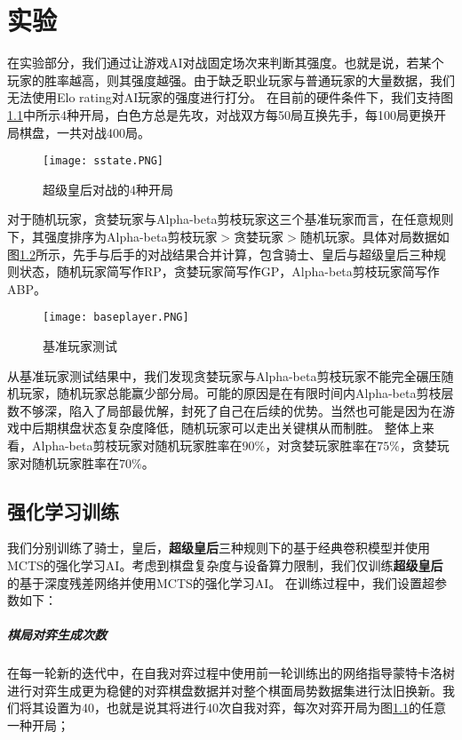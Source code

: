 \chapter{实验}
\label{chap:experiment}
在实验部分，我们通过让游戏AI对战固定场次来判断其强度。也就是说，若某个玩家的胜率越高，则其强度越强。由于缺乏职业玩家与普通玩家的大量数据，我们无法使用Elo rating对AI玩家的强度进行打分\cite{glickman1999rating}。
在目前的硬件条件下，我们支持图\ref{fig:sstate}中所示4种开局，白色方总是先攻，对战双方每50局互换先手，每100局更换开局棋盘，一共对战400局。
\begin{figure}[H]
    \centering
    \texttt{[image: sstate.PNG]}
    \caption[sstate]{%
        超级皇后对战的4种开局%
      }
    \label{fig:sstate}
\end{figure}
对于随机玩家，贪婪玩家与Alpha-beta剪枝玩家这三个基准玩家而言，在任意规则下，其强度排序为Alpha-beta剪枝玩家$>$贪婪玩家$>$随机玩家。具体对局数据如图\ref{fig:baseresult}所示，先手与后手的对战结果合并计算，包含骑士、皇后与超级皇后三种规则状态，随机玩家简写作RP，贪婪玩家简写作GP，Alpha-beta剪枝玩家简写作ABP。
\begin{figure}[htb]
    \centering
    \texttt{[image: baseplayer.PNG]}
    \caption[baseresult]{%
        基准玩家测试%
      }
    \label{fig:baseresult}
\end{figure}
从基准玩家测试结果中，我们发现贪婪玩家与Alpha-beta剪枝玩家不能完全碾压随机玩家，随机玩家总能赢少部分局。可能的原因是在有限时间内Alpha-beta剪枝层数不够深，陷入了局部最优解，封死了自己在后续的优势。当然也可能是因为在游戏中后期棋盘状态复杂度降低，随机玩家可以走出关键棋从而制胜。
整体上来看，Alpha-beta剪枝玩家对随机玩家胜率在$90\%$，对贪婪玩家胜率在$75\%$，贪婪玩家对随机玩家胜率在$70\%$。
\section{强化学习训练}
我们分别训练了骑士，皇后，\textbf{超级皇后}三种规则下的基于经典卷积模型并使用MCTS的强化学习AI。考虑到棋盘复杂度与设备算力限制，我们仅训练\textbf{超级皇后}的基于深度残差网络并使用MCTS的强化学习AI。
在训练过程中，我们设置超参数如下：
\paragraph{棋局对弈生成次数}
在每一轮新的迭代中，在自我对弈过程中使用前一轮训练出的网络指导蒙特卡洛树进行对弈生成更为稳健的对弈棋盘数据并对整个棋面局势数据集进行汰旧换新。我们将其设置为40，也就是说其将进行40次自我对弈，每次对弈开局为图\ref{fig:sstate}的任意一种开局；
